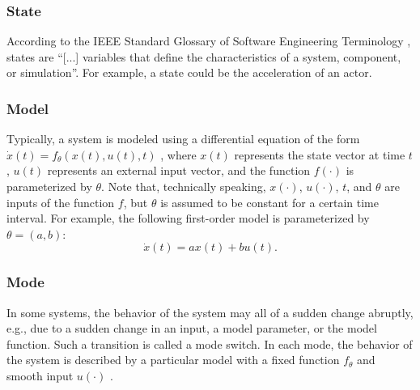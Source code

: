 \subsubsection{State}
\label{sec:state}
According to the IEEE Standard Glossary of Software Engineering Terminology \cite{ieee1990glossary}, states are ``[...] variables that define the characteristics of a system, component, or simulation''. For example, a state could be the acceleration of an actor.

\subsubsection{Model}
\label{sec:model}
Typically, a system is modeled using a differential equation of the form $\dot{x}(t)=f_{\theta}(x(t), u(t), t)$ \cite{norman2011control}, where $x(t)$ represents the state vector at time $t$, $u(t)$ represents an external input vector, and the function $f(\cdot)$ is parameterized by $\theta$. \cbstart Note that, technically speaking, $x(\cdot)$, $u(\cdot)$, $t$, and $\theta$ are inputs of the function $f$, but $\theta$ is assumed to be constant for a certain time interval. For example, the following first-order model is parameterized by $\theta=(a,b)$:
\begin{equation}
	\dot{x}(t) = a x(t) + b u(t).
\end{equation}
\cbend


\subsubsection{Mode}
\label{sec:mode}
In some systems, the behavior of the system may all of a sudden change abruptly, e.g., due to a sudden change in an input, a model parameter, or the model function. Such a transition is called a mode switch.
In each mode, the behavior of the system is described by a particular model with a fixed function $f_{\theta}$ and smooth input $u(\cdot)$ \cite{deschutter2000optimal}.

